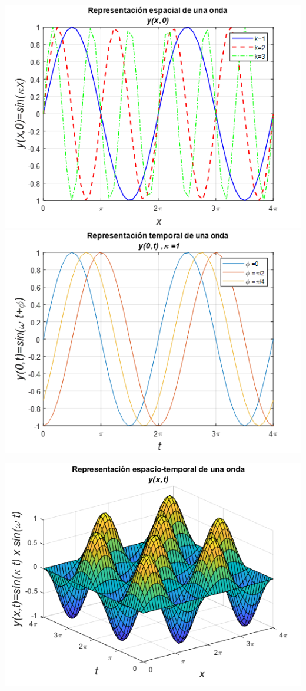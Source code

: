 \documentclass[letterpaper]{report}
\begin{document}
\begin{mdframed}[backgroundcolor=azulpastel]
\begin{mdframed}[backgroundcolor=verdeclaro]
\centering
\includegraphics[width=0.8\linewidth]{f01}
\includegraphics[width=0.8\linewidth]{f02}
\end{mdframed}

\begin{mdframed}[backgroundcolor=verdeclaro]
\centering
\includegraphics[width=0.8\linewidth]{f03}
\end{mdframed}


\end{mdframed}
\end{document}
